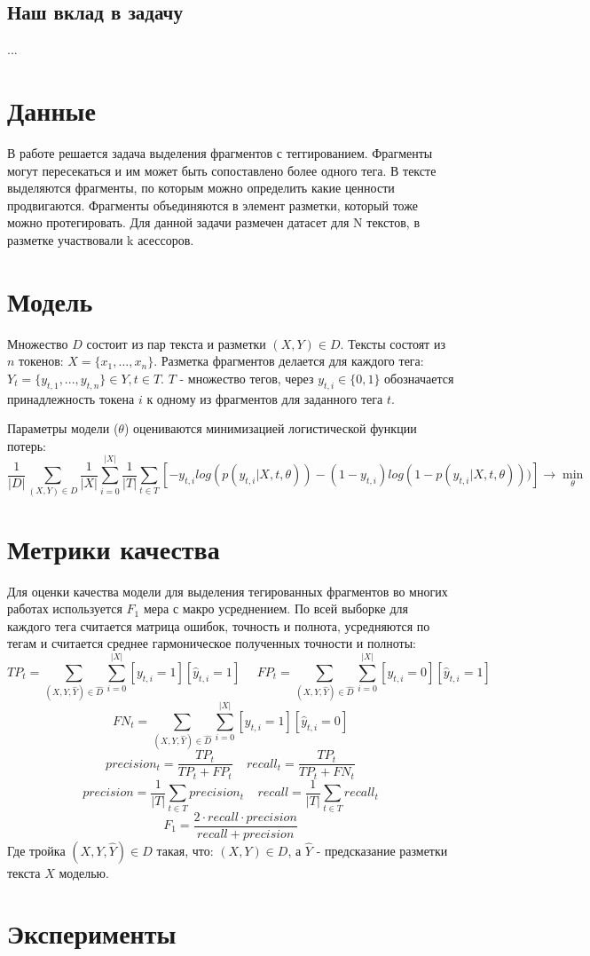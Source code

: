\documentclass{article}
\begin{document}
\subsection{Наш вклад в задачу}

...


\section{Данные}

В работе решается задача выделения фрагментов с теггированием. Фрагменты могут пересекаться и им может быть сопоставлено более одного тега. В тексте выделяются фрагменты, по которым можно определить какие ценности продвигаются. Фрагменты объединяются в элемент разметки, который тоже можно протегировать. Для данной задачи размечен датасет для N текстов, в разметке участвовали k асессоров.

\section{Модель}

Множество $D$ состоит из пар текста и разметки $(X, Y) \in D$.
Тексты состоят из $n$ токенов: $X = \{ x_1, ..., x_n \}$. Разметка фрагментов делается для каждого тега: $Y_t = \{ y_{t, 1}, ..., y_{t, n} \} \in Y, t \in T$. $T$ - множество тегов, через $y_{t, i} \in \{0, 1\}$ обозначается принадлежность токена $i$ к одному из фрагментов для заданного тега $t$.

Параметры модели ($\theta$) оцениваются минимизацией логистической функции потерь:
$$
\frac{1}{|D|} \sum_{(X, Y) \in D} \frac{1}{|X|} \sum_{i = 0}^{|X|} \frac{1}{|T|} \sum_{t \in T} [ - y_{t, i} log(p(y_{t, i}|X, t, \theta)) - (1 - y_{t, i}) log(1 - p(y_{t, i}|X, t, \theta)))] \rightarrow \min_{\theta}
$$

\section{Метрики качества}

Для оценки качества модели для выделения тегированных фрагментов во многих работах используется $F_1$ мера с макро усреднением. По всей выборке для каждого тега считается матрица ошибок, точность и полнота, усредняются по тегам и считается среднее гармоническое полученных точности и полноты:
$$
TP_t = \sum_{(X, Y, \hat{Y}) \in \hat{D}} \sum_{i=0}^{|X|} [y_{t, i} = 1][\hat{y}_{t, i} = 1] ~~~~~~
FP_t = \sum_{(X, Y, \hat{Y}) \in \hat{D}} \sum_{i=0}^{|X|} [y_{t, i} = 0][\hat{y}_{t, i} = 1]
$$
$$
FN_t = \sum_{(X, Y, \hat{Y}) \in \hat{D}} \sum_{i=0}^{|X|} [y_{t, i} = 1][\hat{y}_{t, i} = 0]
$$
$$
precision_t = \frac{TP_t}{TP_t + FP_t}~~~~~
recall_t = \frac{TP_t}{TP_t + FN_t}
$$
$$
precision = \frac{1}{|T|} \sum_{t \in T} precision_t~~~~~
recall = \frac{1}{|T|} \sum_{t \in T} recall_t
$$
$$
F_1 = \frac{2 \cdot recall \cdot precision}{recall + precision}
$$
Где тройка $(X, Y, \hat{Y}) \in \hat{D}$ такая, что: $(X, Y) \in D$, а $\hat{Y}$ - предсказание разметки текста $X$ моделью.

\section{Эксперименты}



\end{document}

